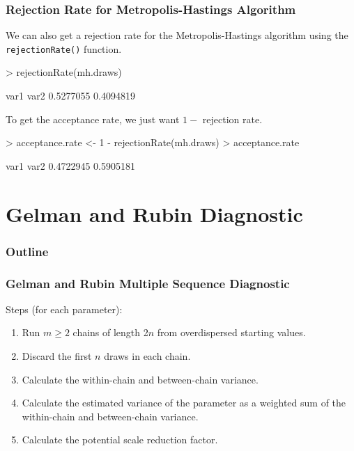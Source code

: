 \documentclass[handout]{beamer}
\begin{document}
\begin{frame}[fragile]
\frametitle{Rejection Rate for Metropolis-Hastings Algorithm}
\pause
We can also get a rejection rate for the Metropolis-Hastings algorithm
using the {\tt rejectionRate()} function.
\pause
\medskip
\tiny
\begin{Schunk}
\begin{Sinput}
> rejectionRate(mh.draws)
\end{Sinput}
\begin{Soutput}
     var1      var2 
0.5277055 0.4094819 
\end{Soutput}
\end{Schunk}
\normalsize
\bigskip
\pause
To get the acceptance rate, we just want $1 - $ rejection rate.
\pause
\medskip
\tiny
\begin{Schunk}
\begin{Sinput}
> acceptance.rate <- 1 - rejectionRate(mh.draws)
> acceptance.rate
\end{Sinput}
\begin{Soutput}
     var1      var2 
0.4722945 0.5905181 
\end{Soutput}
\end{Schunk}
\normalsize
\end{frame}

\section{Gelman and Rubin Diagnostic}

\begin{frame}
\frametitle{Outline}
\tableofcontents[currentsection]
\end{frame}

\begin{frame}
\frametitle{Gelman and Rubin Multiple Sequence Diagnostic}
\pause
Steps (for each parameter):
\pause
\begin{enumerate}
\item Run $m \ge 2$ chains of length 2$n$ from overdispersed starting values.
\pause
\item Discard the first $n$ draws in each chain.
\pause
\item Calculate the within-chain and between-chain variance.
\pause
\item Calculate the estimated variance of the parameter as a weighted
sum of the within-chain and between-chain variance.
\pause
\item Calculate the potential scale reduction factor.  
\end{enumerate}
\end{frame}
\end{document}
